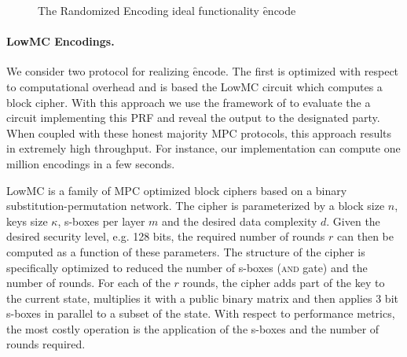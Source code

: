 \begin{figure}[ht]
	\caption{The Randomized Encoding ideal functionality \f{encode}}
	\label{fig:randomized-encode-ideal}	
\end{figure}


\paragraph{LowMC Encodings.}
We consider two protocol for realizing \f{encode}. The first is optimized with respect to computational overhead and is based the LowMC circuit\cite{lowmc} which computes a block cipher. With this approach we use the framework of \cite{aby3, highthroughput} to evaluate the a circuit implementing this PRF and reveal the output to the designated party. When coupled with these honest majority MPC protocols, this approach results in extremely high throughput. For instance, our implementation can compute one million encodings in a few seconds.

LowMC is a family of MPC optimized block ciphers based on a binary substitution-permutation network. The cipher is parameterized by a block size $n$, keys size $\kappa$, s-boxes per layer $m$ and the desired data complexity $d$. Given the desired security level, e.g. 128 bits, the required number of rounds $r$ can then be computed as a function of these parameters. The structure of the cipher is specifically optimized to reduced the number of s-boxes (\textsc{and} gate) and the number of rounds. For each of the $r$ rounds, the cipher adds part of the key to the current state, multiplies it with a public binary matrix and then applies 3 bit s-boxes in parallel to a subset of the state. With respect to performance metrics, the most costly operation is the application of the s-boxes and the number of rounds required. 


